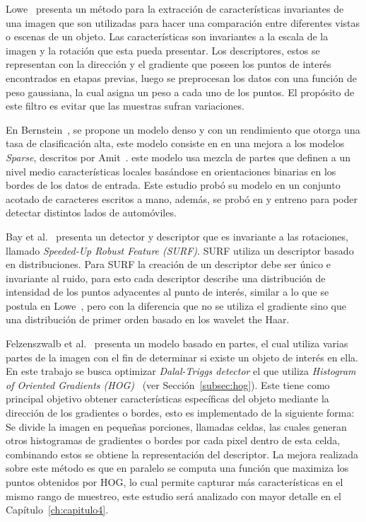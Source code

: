 Lowe~\cite{sift2004} presenta un método para la extracción de características invariantes de una imagen que son utilizadas para hacer una comparación entre diferentes vistas o escenas de un objeto. Las características son invariantes a la escala de la imagen y la rotación que esta pueda presentar. Los descriptores, estos se representan con la dirección y el gradiente que poseen los puntos de interés encontrados en etapas previas, luego se preprocesan los datos con una función de peso gaussiana, la cual asigna un peso a cada uno de los puntos. El propósito de este filtro es evitar que las muestras sufran variaciones.

En Bernstein~\cite{statistical2005}, se propone un modelo denso y con un rendimiento que otorga una tasa de clasificación alta, este modelo consiste en en una mejora a los modelos \textit{Sparse}, descritos por Amit~\cite{Amit2002}. este modelo usa mezcla de partes que definen a un nivel medio características locales basándose en orientaciones binarias en los bordes de los datos de entrada. Este estudio probó su modelo en un conjunto acotado de caracteres escritos a mano, además, se probó en y entreno para poder detectar distintos lados de automóviles.

Bay et al.~\cite{surf2008} presenta un detector y descriptor que es invariante a las rotaciones, llamado \textit{Speeded-Up Robust Feature (SURF)}. SURF utiliza un descriptor basado en distribuciones. Para SURF la creación de un descriptor debe ser único e invariante al ruido, para esto cada descriptor describe una distribución de intensidad de los puntos adyacentes al punto de interés, similar a lo que se postula en Lowe~\cite{sift2004}, pero con la diferencia que no se utiliza el gradiente sino que una distribución de primer orden basado en los wavelet the Haar.

Felzenszwalb et al.~\cite{Felzenszwalb2010} presenta un modelo basado en partes,  el cual utiliza varias partes de la imagen con el fin de determinar si existe un objeto de interés en ella. En este trabajo se busca optimizar \textit{Dalal-Triggs detector} el que utiliza \textit{Histogram of Oriented Gradients (HOG)}~\cite{hog2005} (ver Sección~\ref{subsec:hog}). Este tiene como principal objetivo obtener características específicas del objeto mediante la dirección de los gradientes o bordes, esto es implementado de la siguiente forma: Se divide la imagen en pequeñas porciones, llamadas celdas, las cuales generan otros histogramas de gradientes o bordes por cada pixel dentro de esta celda, combinando estos se obtiene la representación del descriptor. La mejora realizada sobre este método es que en paralelo se computa una función que maximiza los puntos obtenidos por HOG, lo cual permite capturar más características en el mismo rango de muestreo, este estudio será analizado con mayor detalle en el Capítulo~\ref{ch:capitulo4}.

